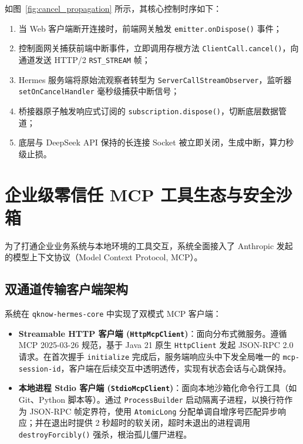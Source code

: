 如图~\ref{fig:cancel_propagation} 所示，其核心控制时序如下：
\begin{enumerate}
    \item 当 Web 客户端断开连接时，前端网关触发 \texttt{emitter.onDispose()} 事件；
    \item 控制面网关捕获前端中断事件，立即调用存根方法 \texttt{ClientCall.cancel()}，向通道发送 HTTP/2 \texttt{RST\_STREAM} 帧；
    \item Hermes 服务端将原始流观察者转型为 \texttt{ServerCallStreamObserver}，监听器 \texttt{setOnCancelHandler} 毫秒级捕获中断信号；
    \item 桥接器原子触发响应式订阅的 \texttt{subscription.dispose()}，切断底层数据管道；
    \item 底层与 DeepSeek API 保持的长连接 Socket 被立即关闭，生成中断，算力秒级止损。
\end{enumerate}

\section{企业级零信任 MCP 工具生态与安全沙箱}

为了打通企业业务系统与本地环境的工具交互，系统全面接入了 Anthropic 发起的模型上下文协议（Model Context Protocol, MCP）。

\subsection{双通道传输客户端架构}
系统在 \texttt{qknow-hermes-core} 中实现了双模式 MCP 客户端：
\begin{itemize}
    \item \textbf{Streamable HTTP 客户端 (\texttt{HttpMcpClient})}：面向分布式微服务。遵循 MCP 2025-03-26 规范，基于 Java 21 原生 \texttt{HttpClient} 发起 JSON-RPC 2.0 请求。在首次握手 \texttt{initialize} 完成后，服务端响应头中下发全局唯一的 \texttt{mcp-session-id}，客户端在后续交互中透明透传，实现有状态会话与心跳保持。
    \item \textbf{本地进程 Stdio 客户端 (\texttt{StdioMcpClient})}：面向本地沙箱化命令行工具（如 Git、Python 脚本等）。通过 \texttt{ProcessBuilder} 启动隔离子进程，以换行符作为 JSON-RPC 帧定界符，使用 \texttt{AtomicLong} 分配单调自增序号匹配异步响应；并在退出时提供 2 秒超时的软关闭，超时未退出的进程调用 \texttt{destroyForcibly()} 强杀，根治孤儿僵尸进程。
\end{itemize}

